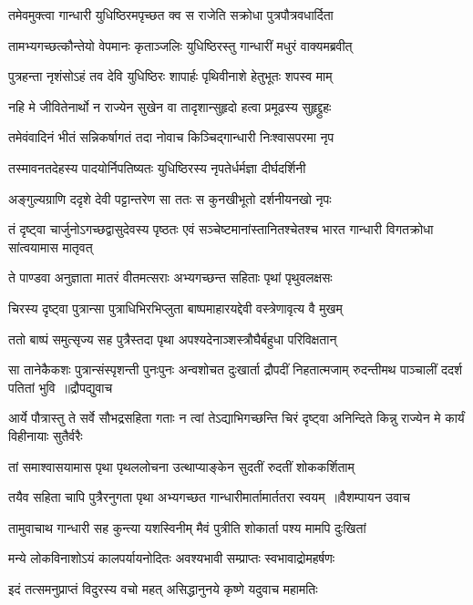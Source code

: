 \twolineshloka
{तमेवमुक्त्वा गान्धारी युधिष्ठिरमपृच्छत}
{क्व स राजेति सक्रोधा पुत्रपौत्रवधार्दिता}


\twolineshloka
{तामभ्यगच्छत्कौन्तेयो वेपमानः कृताञ्जलिः}
{युधिष्ठिरस्तु गान्धारीं मधुरं वाक्यमब्रवीत्}


\twolineshloka
{पुत्रहन्ता नृशंसोऽहं तव देवि युधिष्ठिरः}
{शापार्हः पृथिवीनाशे हेतुभूतः शपस्व माम्}


\twolineshloka
{नहि मे जीवितेनार्थो न राज्येन सुखेन वा}
{तादृशान्सुहृदो हत्वा प्रमूढस्य सुहृद्द्रुहः}


\twolineshloka
{तमेवंवादिनं भीतं सन्निकर्षागतं तदा}
{नोवाच किञ्चिद्गान्धारी निःश्वासपरमा नृप}


\twolineshloka
{तस्मावनतदेहस्य पादयोर्निपतिष्यतः}
{युधिष्ठिरस्य नृपतेर्धर्मज्ञा दीर्घदर्शिनी}


\twolineshloka
{अङ्गुल्यग्राणि ददृशे देवी पट्टान्तरेण सा}
{ततः स कुनखीभूतो दर्शनीयनखो नृपः}


तं दृष्ट्वा चार्जुनोऽगच्छद्वासुदेवस्य पृष्ठतः
\twolineshloka
{एवं सञ्चेष्टमानांस्तानितश्चेतश्च भारत}
{गान्धारी विगतक्रोधा सांत्वयामास मातृवत्}


\twolineshloka
{ते पाण्डवा अनुज्ञाता मातरं वीतमत्सराः}
{अभ्यगच्छन्त सहिताः पृथां पृथुवलक्षसः}


\twolineshloka
{चिरस्य दृष्ट्वा पुत्रान्सा पुत्राधिभिरभिप्लुता}
{बाष्पमाहारयद्देवी वस्त्रेणावृत्य वै मुखम्}


\twolineshloka
{ततो बाष्पं समुत्सृज्य सह पुत्रैस्तदा पृथा}
{अपश्यदेनाञ्शस्त्रौघैर्बहुधा परिविक्षतान्}


\fourlineindentedshloka
{सा तानेकैकशः पुत्रान्संस्पृशन्ती पुनःपुनः}
{अन्वशोचत दुःखार्ता द्रौपदीं निहतात्मजाम्}
{रुदन्तीमथ पाञ्चालीं ददर्श पतितां भुवि ॥द्रौपद्युवाच}
{}


\threelineshloka
{आर्ये पौत्रास्तु ते सर्वे सौभद्रसहिता गताः}
{न त्वां तेऽद्याभिगच्छन्ति चिरं दृष्ट्वा अनिन्दिते}
{किन्नु राज्येन मे कार्यं विहीनायाः सुतैर्वरैः}


\twolineshloka
{तां समाश्वासयामास पृथा पृथललोचना}
{उत्थाप्याङ्केन सुदतीं रुदतीं शोककर्शिताम्}


\threelineshloka
{तयैव सहिता चापि पुत्रैरनुगता पृथा}
{अभ्यगच्छत गान्धारीमार्तामार्ततरा स्वयम् ॥वैशम्पायन उवाच}
{}


\twolineshloka
{तामुवाचाथ गान्धारी सह कुन्त्या यशस्विनीम्}
{मैवं पुत्रीति शोकार्ता पश्य मामपि दुःखितां}


\twolineshloka
{मन्ये लोकविनाशोऽयं कालपर्यायनोदितः}
{अवश्यभावी सम्प्राप्तः स्वभावाद्रोमहर्षणः}


\twolineshloka
{इदं तत्समनुप्राप्तं विदुरस्य वचो महत्}
{असिद्धानुनये कृष्णे यदुवाच महामतिः}


